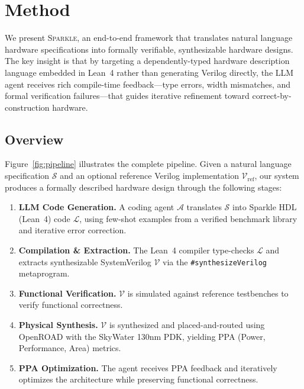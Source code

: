 \section{Method}
\label{sec:method}

We present \textsc{Sparkle}, an end-to-end framework that translates natural language hardware specifications into formally verifiable, synthesizable hardware designs. The key insight is that by targeting a dependently-typed hardware description language embedded in Lean~4 rather than generating Verilog directly, the LLM agent receives rich compile-time feedback---type errors, width mismatches, and formal verification failures---that guides iterative refinement toward correct-by-construction hardware.

\subsection{Overview}
\label{sec:overview}

Figure~\ref{fig:pipeline} illustrates the complete pipeline. Given a natural language specification $\mathcal{S}$ and an optional reference Verilog implementation $\mathcal{V}_{\text{ref}}$, our system produces a formally described hardware design through the following stages:

\begin{enumerate}[leftmargin=*,itemsep=1pt,topsep=2pt]
    \item \textbf{LLM Code Generation.} A coding agent $\mathcal{A}$ translates $\mathcal{S}$ into Sparkle HDL (Lean~4) code $\mathcal{L}$, using few-shot examples from a verified benchmark library and iterative error correction.
    \item \textbf{Compilation \& Extraction.} The Lean~4 compiler type-checks $\mathcal{L}$ and extracts synthesizable SystemVerilog $\mathcal{V}$ via the \texttt{\#synthesizeVerilog} metaprogram.
    \item \textbf{Functional Verification.} $\mathcal{V}$ is simulated against reference testbenches to verify functional correctness.
    \item \textbf{Physical Synthesis.} $\mathcal{V}$ is synthesized and placed-and-routed using OpenROAD with the SkyWater 130nm PDK, yielding PPA (Power, Performance, Area) metrics.
    \item \textbf{PPA Optimization.} The agent receives PPA feedback and iteratively optimizes the architecture while preserving functional correctness.
\end{enumerate}

